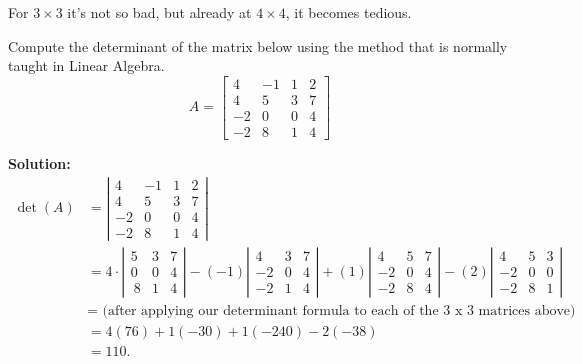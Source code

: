 \Qed


For $3 \times 3$ it's not so bad, but already at $4 \times 4$, it becomes tedious. \\

\begin{example}
Compute the determinant of the matrix below using the method that is normally taught in Linear Algebra.
$$ A=\left[\begin{array}{rrrr} 4 & -1 & 1 & 2\\
4 & 5 & 3 & 7\\ -2 & 0 & 0 & 4\\  -2 & 8 & 1 & 4\end{array}\right] $$
\end{example}

\textbf{Solution:}
\begin{align*}
  \det(A) &= \left|\begin{array}{rrrr} 4 & -1 & 1 & 2\\
4 & 5 & 3 & 7\\ -2 & 0 & 0 & 4\\  -2 & 8 & 1 & 4\end{array}\right| \\
&= 4 \cdot \left|\begin{array}{rrr}
 5 & 3 & 7\\  0 & 0 & 4\\ \  8 & 1 & 4\end{array}\right| - (-1) \left|\begin{array}{rrr} 4 & 3 & 7\\ -2  & 0 & 4\\  -2 & 1 & 4\end{array}\right| + (1)  \left|\begin{array}{rrr} 
4 & 5  & 7\\ -2 & 0 &  4\\  -2 & 8 &  4\end{array}\right| - (2)  \left|\begin{array}{rrr}
4 & 5 & 3 \\ -2 & 0 & 0 \\  -2 & 8 & 1\end{array}\right| \\
& =\text{ (after applying our determinant formula to each of the 3 x 3 matrices above)}\\
& = 4 (76) + 1 (-30) + 1 (-240) - 2 (-38) \\
 &= 110.
\end{align*}
\Qed

